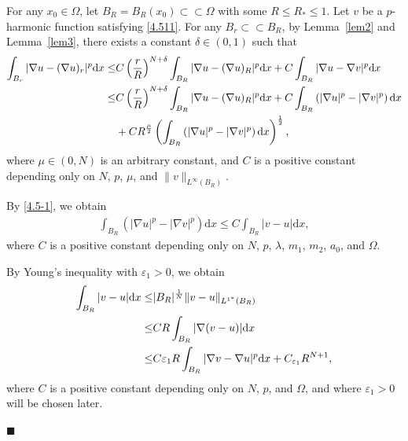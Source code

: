 \documentclass[onecolumn]{autart}
\newenvironment{proof}{{\it Proof: \enspace}}{\hfill $\blacksquare$\par}
\begin{document}
	\begin{proof} For any $x_0\in \Omega$, let  $B_R = B_R(x_0)\subset\subset \Omega$ with some $ R \leq R_* \leq 1$.
		Let $ v $ be  a $p$-harmonic function satisfying \eqref{4.511}. For any $B_r \subset\subset B_R $,	by Lemma~\ref{lem2} and Lemma~\ref{lem3}, there exists a constant $\delta \in (0,1)$ such that
		\begin{align}
			\int_{B_r} |\nabla u - (\nabla u)_r|^p  \mathrm{d}x
			\leq
			& C \left( \frac{r}{R} \right)^{N+\delta} \int_{B_R} |\nabla u - (\nabla u)_R|^p  \mathrm{d}x + C\int_{B_R} |\nabla u - \nabla v|^p  \mathrm{d}x
			\notag \\ \leq
			& C\left( \frac{r}{R} \right)^{N+\delta} \int_{B_R} |\nabla u - (\nabla u)_R|^p \mathrm{d}x  + C\int_{B_R} \left(|\nabla u|^p - |\nabla v|^p\right) \mathrm{d}x
			\notag\\
			&+ C R^{\frac{\mu}{2}} \left( \int_{B_R} \left(|\nabla u|^p - |\nabla v|^p\right) \mathrm{d}x \right)^{\frac{1}{2}}, \label{4.2}
		\end{align}
		where $\mu \in (0, N)$ is an arbitrary constant, and  $C$ is  a  positive  constant depending only on $N$, $p$, $\mu$,  and $\|v\|_{L^\infty(B_R)}$.
		
		
		
		By \eqref{4.5-1}, we obtain
		\begin{align}\label{4.5}
			\int_{B_R} \left(  |\nabla u|^p -  |\nabla v|^p \right)  \mathrm{d}x \leq C \int_{B_R} |v- u|\mathrm{d}x,
		\end{align}
		where $C$ is a positive  constant  depending only on  $N$, $p$, $\lambda$, $m_1$, $m_2$, $a_0$, and $\Omega$.
		
		By Young's inequality with $\varepsilon_1>0$, we obtain
		\begin{align}
			\int_{B_R} |v - u| \mathrm{d}x
			\leq
			&|B_R|^{\frac{1}{N}}  \|v - u\|_{L^{1^*}(B_R)}
			\notag\\ \leq
			& C R \int_{B_R} |\nabla(v - u)| \mathrm{d}x
			\notag\\ \leq
			& C \varepsilon_1 R \int_{B_R} |\nabla v - \nabla u|^p \mathrm{d}x + C_{\varepsilon_1} R^{N+1},\label{4.6}
		\end{align}
		where $C$ is a positive  constant  depending only on $N$, $p$, and $\Omega$, and where $\varepsilon_1 > 0$ will be chosen later.
		

\end{proof}
\end{document}
